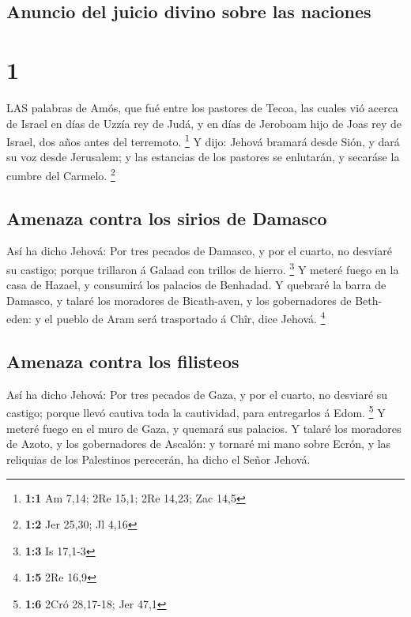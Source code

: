 \hypertarget{anuncio-del-juicio-divino-sobre-las-naciones}{%
\subsection{Anuncio del juicio divino sobre las
naciones}\label{anuncio-del-juicio-divino-sobre-las-naciones}}

\hypertarget{section}{%
\section{1}\label{section}}

 LAS palabras de Amós, que fué entre los pastores de Tecoa,
las cuales vió acerca de Israel en días de Uzzía rey de Judá, y en días
de Jeroboam hijo de Joas rey de Israel, dos años antes del terremoto.
\footnote{\textbf{1:1} Am 7,14; 2Re 15,1; 2Re 14,23; Zac 14,5}
 Y dijo: Jehová bramará desde Sión, y dará su voz desde
Jerusalem; y las estancias de los pastores se enlutarán, y secaráse la
cumbre del Carmelo. \footnote{\textbf{1:2} Jer 25,30; Jl 4,16}

\hypertarget{amenaza-contra-los-sirios-de-damasco}{%
\subsection{Amenaza contra los sirios de
Damasco}\label{amenaza-contra-los-sirios-de-damasco}}

 Así ha dicho Jehová: Por tres pecados de Damasco, y por el
cuarto, no desviaré su castigo; porque trillaron á Galaad con trillos de
hierro. \footnote{\textbf{1:3} Is 17,1-3}  Y meteré fuego en
la casa de Hazael, y consumirá los palacios de Benhadad.  Y
quebraré la barra de Damasco, y talaré los moradores de Bicath-aven, y
los gobernadores de Beth-eden: y el pueblo de Aram será trasportado á
Chîr, dice Jehová. \footnote{\textbf{1:5} 2Re 16,9}

\hypertarget{amenaza-contra-los-filisteos}{%
\subsection{Amenaza contra los
filisteos}\label{amenaza-contra-los-filisteos}}

 Así ha dicho Jehová: Por tres pecados de Gaza, y por el
cuarto, no desviaré su castigo; porque llevó cautiva toda la cautividad,
para entregarlos á Edom. \footnote{\textbf{1:6} 2Cró 28,17-18; Jer 47,1}
 Y meteré fuego en el muro de Gaza, y quemará sus palacios.
 Y talaré los moradores de Azoto, y los gobernadores de
Ascalón: y tornaré mi mano sobre Ecrón, y las reliquias de los
Palestinos perecerán, ha dicho el Señor Jehová.

